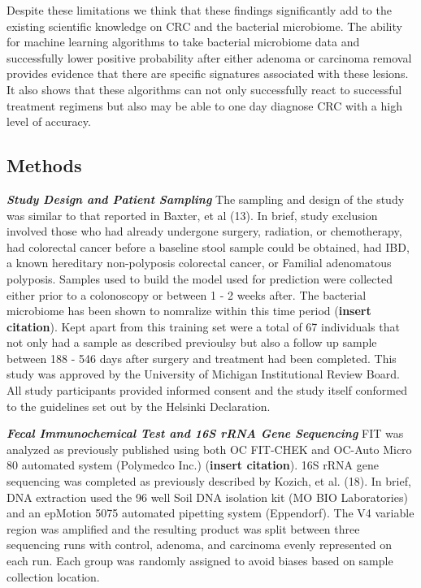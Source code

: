 \documentclass[12pt,]{article}
\begin{document}
Despite these limitations we think that these findings significantly add
to the existing scientific knowledge on CRC and the bacterial
microbiome. The ability for machine learning algorithms to take
bacterial microbiome data and successfully lower positive probability
after either adenoma or carcinoma removal provides evidence that there
are specific signatures associated with these lesions. It also shows
that these algorithms can not only successfully react to successful
treatment regimens but also may be able to one day diagnose CRC with a
high level of accuracy.

\newpage

\subsection{Methods}\label{methods}

\textbf{\emph{Study Design and Patient Sampling}} The sampling and
design of the study was similar to that reported in Baxter, et al (13).
In brief, study exclusion involved those who had already undergone
surgery, radiation, or chemotherapy, had colorectal cancer before a
baseline stool sample could be obtained, had IBD, a known hereditary
non-polyposis colorectal cancer, or Familial adenomatous polyposis.
Samples used to build the model used for prediction were collected
either prior to a colonoscopy or between 1 - 2 weeks after. The
bacterial microbiome has been shown to nomralize within this time period
(\textbf{insert citation}). Kept apart from this training set were a
total of 67 individuals that not only had a sample as described
previoulsy but also a follow up sample between 188 - 546 days after
surgery and treatment had been completed. This study was approved by the
University of Michigan Institutional Review Board. All study
participants provided informed consent and the study itself conformed to
the guidelines set out by the Helsinki Declaration.

\textbf{\emph{Fecal Immunochemical Test and 16S rRNA Gene Sequencing}}
FIT was analyzed as previously published using both OC FIT-CHEK and
OC-Auto Micro 80 automated system (Polymedco Inc.) (\textbf{insert
citation}). 16S rRNA gene sequencing was completed as previously
described by Kozich, et al. (18). In brief, DNA extraction used the 96
well Soil DNA isolation kit (MO BIO Laboratories) and an epMotion 5075
automated pipetting system (Eppendorf). The V4 variable region was
amplified and the resulting product was split between three sequencing
runs with control, adenoma, and carcinoma evenly represented on each
run. Each group was randomly assigned to avoid biases based on sample
collection location.
\end{document}
